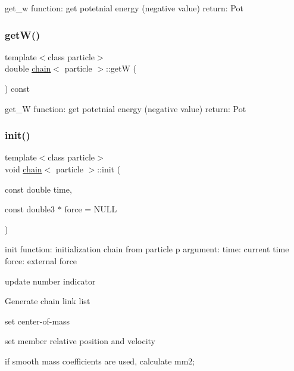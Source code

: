 get\+\_\+w function\+: get potetnial energy (negative value) return\+: Pot 

\hypertarget{classchain_a4f72c2eb51358d5ee7979803d1bc72cb}{}\label{classchain_a4f72c2eb51358d5ee7979803d1bc72cb} 
\subsubsection{\texorpdfstring{get\+W()}{getW()}}
{\footnotesize\ttfamily template$<$class particle$>$ \\
double \hyperlink{classchain}{chain}$<$ particle $>$\+::getW (\begin{DoxyParamCaption}{ }\end{DoxyParamCaption}) const\hspace{0.3cm}{\ttfamily [inline]}}



get\+\_\+W function\+: get potetnial energy (negative value) return\+: Pot 

\hypertarget{classchain_ab8d6469cd14e32f5ee3b5aba24bdc601}{}\label{classchain_ab8d6469cd14e32f5ee3b5aba24bdc601} 
\subsubsection{\texorpdfstring{init()}{init()}}
{\footnotesize\ttfamily template$<$class particle$>$ \\
void \hyperlink{classchain}{chain}$<$ particle $>$\+::init (\begin{DoxyParamCaption}\item[{const double}]{time,  }\item[{const double3 $\ast$}]{force = {\ttfamily NULL} }\end{DoxyParamCaption})\hspace{0.3cm}{\ttfamily [inline]}}



init function\+: initialization chain from particle p argument\+: time\+: current time force\+: external force 

update number indicator

Generate chain link list

set center-\/of-\/mass

set member relative position and velocity

if smooth mass coefficients are used, calculate mm2;

